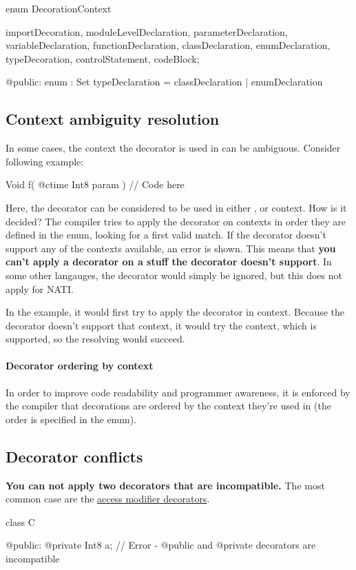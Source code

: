 \begin{code}
enum DecorationContext {
	importDecoration,
	moduleLevelDeclaration,
	parameterDeclaration,
	variableDeclaration,
	functionDeclaration,
	classDeclaration,
	enumDeclaration,
	typeDecoration,
	controlStatement,
	codeBlock;
	
@public:
	enum : Set {
		typeDeclaration = classDeclaration | enumDeclaration	
	}
}
\end{code} \label{enum:DecorationContext}

\subsection{Context ambiguity resolution} In some cases, the context the decorator is used in can be ambiguous. Consider following example:
\begin{code}
Void f( @ctime Int8 param ) {
	// Code here
}
\end{code}

Here, the  decorator can be considered to be used in either ,  or  context. How is it decided? The compiler tries to apply the decorator on contexts in order they are defined in the  enum, looking for a first valid match. If the decorator doesn't support any of the contexts available, an error is shown. This means that \textbf{you can't apply a decorator on a stuff the decorator doesn't support}. In some other langauges, the decorator would simply be ignored, but this does not apply for NATI.

In the example, it would first try to apply the decorator in   context. Because the  decorator doesn't support that context, it would try the   context, which is supported, so the resolving would succeed.

\paragraph{Decorator ordering by context} In order to improve code readability and programmer awareness, it is enforced by the compiler that decorations are ordered by the context they're used in (the order is specified in the  enum).

\subsection{Decorator conflicts}
\textbf{You can not apply two decorators that are incompatible.} The most common case are the \hyperref[accessModifierDecorators]{access modifier decorators}.
\begin{code}
class C {

@public:
	@private Int8 a; // Error - @public and @private decorators are incompatible
	
}
\end{code}

